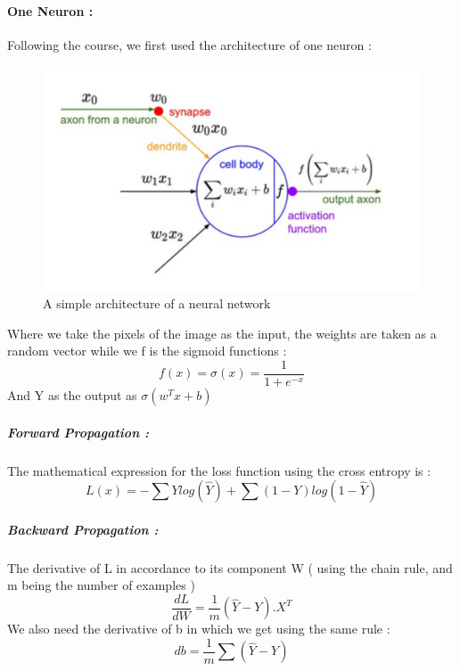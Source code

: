 \documentclass[a4paper,12pt,twoside]{report}
\begin{document}
\newpage

\paragraph{One Neuron : }

Following the course, we first used the architecture of one neuron : 

\begin{figure}[H]
\centering
\includegraphics[scale = 0.6]{One_neuron_arch.png}
\caption{A simple architecture of a neural network}
\end{figure}

Where we take the pixels of the image as the input, the weights are taken as a random vector while we f is the sigmoid functions :
$$ f(x)= \sigma(x) = \frac{1}{1 + e^{-x}} $$
And Y as the output as $\sigma(w^Tx + b)$
 
\subparagraph{Forward Propagation : }

The mathematical expression for the loss function using the cross entropy is :
$$ L(x) = - \sum Y log(\hat{Y}) + \sum (1 - Y)log(1-\hat{Y})$$

\subparagraph{Backward Propagation :}

The derivative of L in accordance to its component W ( using the chain rule, and m being the number of examples )
$$\frac{dL}{dW} = \frac{1}{m} (\hat{Y} - Y).X^T $$
We also need the derivative of b in which we get using the same rule :
$$ db = \frac{1}{m} \sum (\hat{Y} - Y)  $$
\end{document}
